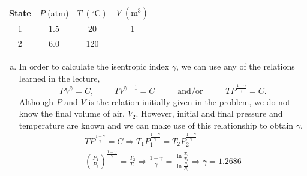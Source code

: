 \documentclass[12pts,a4paper,amsmath,amssymb,floatfix]{article}%
\newcommand{\frc}{\displaystyle\frac}
\begin{document}
\begin{enumerate}[1)]
        \begin{center}
           \begin{tabular}{c c c c}
               {\bf State}  &   $P$ (atm)  &   $T\;\left(^{\circ}\text{C}\right)$ & $V\;\left(\text{m}^{3}\right)$ \\
                    1       &     1.5      &            20                      & 1  \\
                    2       &     6.0      &            120                     &     \\              
           \end{tabular}
        \end{center}
        \begin{enumerate}[(a)]
           \item In order to calculate the isentropic index $\gamma$, we can use any of the relations learned in the lecture,
               \begin{displaymath} 
                   P V^{\gamma} = C, \hspace{1cm} T V^{\gamma-1} = C \hspace{1cm} \text{ and/or } \hspace{1cm} T P^{\frac{1-\gamma}{\gamma}} = C.
               \end{displaymath}
               Although $P$ and $V$ is the relation initially given in the problem, we do not know the final volume of air, $V_{2}$. However, initial and final pressure and temperature are known and we can make use of this relationship to obtain $\gamma$,
               \begin{eqnarray} 
                   T P^{\frac{1-\gamma}{\gamma}} = C \Rightarrow T_{1}P_{1}^{\frac{1-\gamma}{\gamma}} = T_{2}P_{2}^{\frac{1-\gamma}{\gamma}} \nonumber \\
                   \left(\frc{P_{1}}{P_{2}}\right)^{\frac{1-\gamma}{\gamma}} = \frc{T_{2}}{T_{1}} \Rightarrow \frc{1-\gamma}{\gamma} = \frc{\ln{\frac{T_{2}}{T_{1}}}}{\ln{\frac{P_{1}}{P_{2}}}} \Longrightarrow \gamma = 1.2686  \nonumber
               \end{eqnarray}
                 

\end{enumerate}
\end{enumerate}
\end{document}

